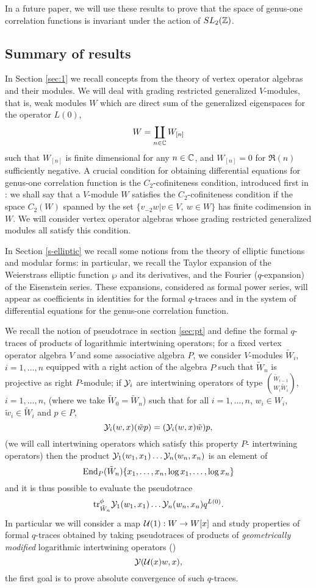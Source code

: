 \documentclass[12pt]{article}
\begin{document}
In a future paper, we will use these results to prove that
the space of genus-one correlation functions is invariant under the
action of $SL_2(\mathbb{Z})$.

\subsection{Summary of results}

In Section \ref{sec:1} we recall concepts from the theory of vertex operator algebras
and their modules. We will deal with grading restricted generalized
$V$-modules, that is, weak modules $W$ which are direct sum of the
generalized eigenspaces for the operator $L(0)$,
$$
  W = \coprod_{n\in \mathbb{C}} W_{[n]}
$$
such that $W_{[n]}$ is finite dimensional for any $n\in \mathbb{C}$, and
$W_{[n]} = 0$ for $\Re(n)$ sufficiently negative. 
A crucial condition for obtaining differential equations for
genus-one correlation function is the $C_2$-cofiniteness condition,
introduced first in \cite{Z}:
we shall say that a $V$-module $W$ satisfies the $C_2$-cofiniteness
condition if the space $C_2(W)$ spanned by the set
$\{v_{-2}w | v \in V, \ w\in W\}$ has finite codimension in $W$.
We will consider vertex operator algebras whose grading restricted
generalized modules all satisfy this condition.

In Section \ref{s-elliptic} we recall some notions from the theory
of elliptic functions and modular forms: in particular, we recall
the Taylor expansion of the Weierstrass elliptic function $\wp$ and
its derivatives, and the Fourier ($q$-expansion) of the Eisenstein
series. These expansions, considered as formal power series, will
appear as coefficients in identities for the formal $q$-traces 
and in the system of differential equations  for the genus-one
correlation function.

We recall the notion of pseudotrace in section \ref{sec:pt}
and define the formal $q$-traces
of products of logarithmic intertwining operators; for a fixed vertex
operator algebra $V$ and some associative algebra $P$, we consider
$V$-modules $\tilde W_i$, $i= 1,\ldots, n$ equipped with a right action
of the algebra $P$ such that $\tilde W_n$ is projective as right $P$-module; 
if $\mathcal{Y}_i$ are intertwining operators of type 
$\binom{\tilde W_{i-1}}{W_i \tilde W_i}$, $i=1,\ldots, n$,
(where we take $\tilde W_0 = \tilde W_n$) such that
for all $i=1,\ldots, n$, $w_i\in W_i$, $\tilde w_i \in \tilde W_i$ and
$p\in P$,
\begin{equation*}
  \mathcal{Y}_i(w, x)(\tilde wp) = (\mathcal{Y}_i(w, x) \tilde w)p,
\end{equation*}
(we will call intertwining operators which satisfy this property
$P$- intertwining operators) then the product
$\mathcal{Y}_1(w_1, x_1)\ldots \mathcal{Y}_n(w_n, x_n)$
is an element of
$$
  \mathrm{End}_P(\tilde W_n)\{x_1,\ldots, x_n, \log x_1,\ldots,\log x_n\}
$$
and it is thus possible to evaluate the pseudotrace
$$
  \mbox{\rm tr}^\phi_{\tilde W_n}\mathcal{Y}_1(w_1, x_1)\ldots \mathcal{Y}_n(w_n, x_n) q^{L(0)}.
$$
In particular we will consider a map $\mathcal{U}(1): W\rightarrow W[x]$ and study
properties of formal $q$-traces obtained by taking pseudotraces of products
of \emph{geometrically modified} logarithmic intertwining operators
(\cite{H2})
$$
  \mathcal{Y}(\mathcal{U}(x)w, x),
$$
the first goal is to prove absolute convergence of such $q$-traces.
\end{document}
